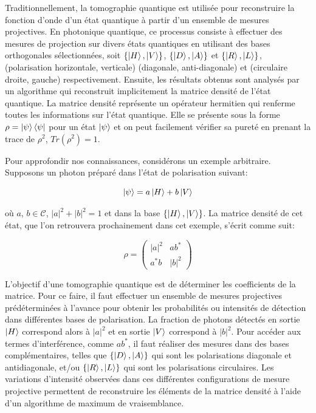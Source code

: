 \begin{onehalfspace}
        
    Traditionnellement, la tomographie quantique est utilisée pour 
    reconstruire la fonction d’onde d’un état quantique à partir d’un 
    ensemble de mesures projectives. En photonique quantique, ce 
    processus consiste à effectuer des mesures de projection sur divers 
    états quantiques en utilisant des bases orthogonales sélectionnées, 
    soit $\{\ket{H}, \ket{V}\}$, $\{\ket{D}, \ket{A}\}$ et $\{\ket{R}, \ket{L}\}$, 
    (polarisation horizontale, verticale) (diagonale, anti-diagonale) et 
    (circulaire droite, gauche) respectivement. Ensuite, les résultats 
    obtenus sont analysés par un algorithme qui reconstruit implicitement la 
    matrice densité de l’état quantique. La matrice densité représente un 
    opérateur hermitien qui renferme toutes les informations sur l’état 
    quantique. Elle se présente sous la forme $\rho = \ket{\psi}\bra{\psi}$ 
    pour un état $\ket{\psi}$ et on peut facilement vérifier sa pureté en prenant 
    la trace de $\rho^2$, $Tr(\rho^2)=1$.

    \noindent Pour approfondir nos connaissances, considérons un exemple 
    arbitraire. Supposons un photon préparé dans l’état de polarisation 
    suivant:
    
    \begin{equation}
        \ket{\psi} = a\ket{H} + b\ket{V}\label{eq:initial_tomo_state}
    \end{equation}

    \noindent où $a$, $b \in \mathcal{C}$, $|a|^2 + |b|^2 = 1$ et dans la 
    base $\{ \ket{H}, \ket{V} \}$. La matrice densité de cet état, que 
    l'on retrouvera prochainement dans cet exemple, s'écrit comme suit:
    
    \begin{equation}
        \rho = \begin{pmatrix}
            |a|^2 & ab^*\\
            a^*b & |b|^2
        \end{pmatrix}
    \end{equation}
    
    \noindent L'objectif d'une tomographie quantique est de déterminer 
    les coefficients de la matrice. Pour ce faire, il faut effectuer 
    un ensemble de mesures projectives prédéterminées à l'avance 
    pour obtenir les probabilités ou intensités de 
    détection dans différentes bases de polarisation. La fraction de 
    photons détectés en sortie $\ket{H}$ correspond alors à $|a|^2$ et en 
    sortie $\ket{V}$ correspond à $|b|^2$. Pour accéder aux termes 
    d’interférence, comme $ab^*$, il faut réaliser des mesures dans des 
    bases complémentaires, telles que $\{\ket{D}, \ket{A}\}$ qui sont les 
    polarisations diagonale et antidiagonale, et/ou $\{\ket{R}, \ket{L}\}$ 
    qui sont les polarisations circulaires. Les variations d’intensité 
    observées dans ces différentes configurations de mesure projective 
    permettent de reconstruire les éléments de la matrice densité 
    à l'aide d'un algorithme de maximum de vraisemblance. 
    

\end{onehalfspace}
